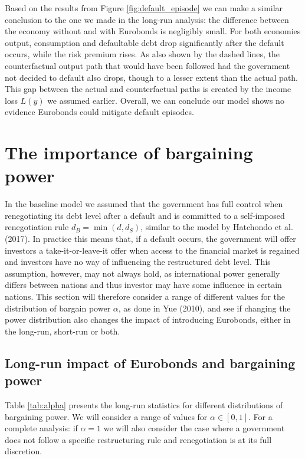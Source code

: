 Based on the results from Figure \ref{fig:default_episode} we can make a similar conclusion to the one we made in the long-run analysis: the difference between the economy without and with Eurobonds is negligibly small. For both economies output, consumption and defaultable debt drop significantly after the default occurs, while the risk premium rises. As also shown by the dashed lines, the counterfactual output path that would have been followed had the government not decided to default also drops, though to a lesser extent than the actual path. This gap between the actual and counterfactual paths is created by the income loss $L(y)$ we assumed earlier. Overall, we can conclude our model shows no evidence Eurobonds could mitigate default episodes.\\

\section{The importance of bargaining power}
In the baseline model we assumed that the government has full control when renegotiating its debt level after a default and is committed to a self-imposed renegotiation rule $d_B = \min(d,d_S)$, similar to the model by Hatchondo et al. (2017). In practice this means that, if a default occurs, the government will offer investors a take-it-or-leave-it offer when access to the financial market is regained and investors have no way of influencing the restructured debt level. This assumption, however, may not always hold, as international power generally differs between nations and thus investor may have some influence in certain nations. This section will therefore consider a range of different values for the distribution of bargain power $\alpha$, as done in Yue (2010), and see if changing the power distribution also changes the impact of introducing Eurobonds, either in the long-run, short-run or both.\\

\subsection{Long-run impact of Eurobonds and bargaining power}
Table \ref{tab:alpha} presents the long-run statistics for different distributions of bargaining power. We will consider a range of values for $\alpha \in [0,1]$. For a complete analysis: if $\alpha = 1$ we will also consider the case where a government does not follow a specific restructuring rule and renegotiation is at its full discretion.\\

